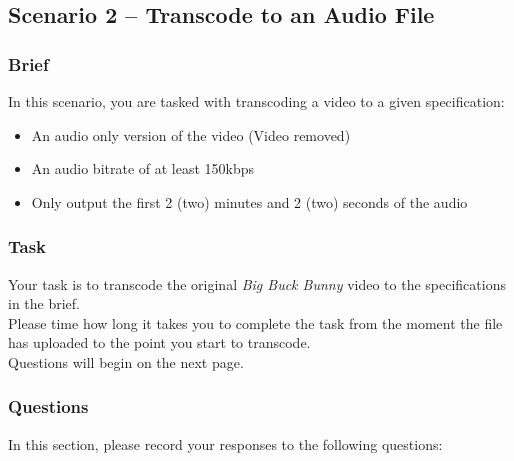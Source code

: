 \subsection{Scenario 2 – Transcode to an Audio File}
\subsubsection{Brief}
In this scenario, you are tasked with transcoding a video to a given specification:
\begin{itemize}
    \item An audio only version of the video (Video removed)
    \item An audio bitrate of at least 150kbps
    \item Only output the first 2 (two) minutes and 2 (two) seconds of the audio
\end{itemize}

\subsubsection{Task}
Your task is to transcode the original \emph{Big Buck Bunny} video to the specifications in the brief. \\
Please time how long it takes you to complete the task from the moment the file has uploaded to the point you start to transcode. \\
Questions will begin on the next page.

\clearpage

\subsubsection{Questions}

In this section, please record your responses to the following questions:

